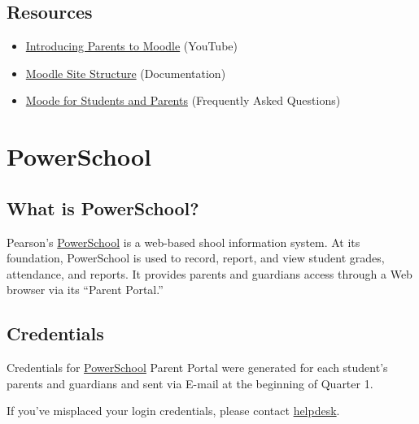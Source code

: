 \documentclass[letterpaper,10pt,english]{sphinxmanual}
\begin{document}
\section{Resources}
\label{moodle:helpdesk}\label{moodle:resources}\begin{itemize}
\item {} 
\href{http://youtu.be/PSwbhCqLSQI}{Introducing Parents to Moodle} (YouTube)

\item {} 
\href{http://docs.moodle.org/26/en/Moodle\_site\_-\_basic\_structure}{Moodle Site Structure} (Documentation)

\item {} 
\href{http://learning.oconeeschools.org/course/view.php?id=477}{Moode for Students and Parents} (Frequently Asked Questions)

\end{itemize}


\chapter{PowerSchool}
\label{powerschool::doc}\label{powerschool:powerschool}\label{powerschool:index-0}

\section{What is PowerSchool?}
\label{powerschool:what-is-powerschool}
Pearson's \href{http://chelseaschool.powerschool.com/}{PowerSchool} is a web-based shool information system. At its foundation, PowerSchool is used to record, report, and view student grades, attendance, and reports. It provides parents and guardians access through a Web browser via its ``Parent Portal.''


\section{Credentials}
\label{powerschool:credentials}
Credentials for \href{http://chelseaschool.powerschool.com/}{PowerSchool} Parent Portal were generated for each student's parents and guardians and sent via E-mail at the beginning of Quarter 1.

If you've misplaced your login credentials, please contact \href{http://chelseapride.org/helpdesk}{helpdesk}.
\end{document}
